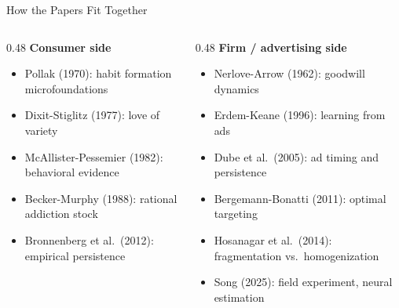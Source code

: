 \documentclass[aspectratio=169,professionalfonts]{beamer}
\newcommand{\hl}[1]{\textbf{\textcolor{UGARed}{#1}}}
\begin{document}
\begin{frame}{How the Papers Fit Together}
  \begin{columns}[T]
    \begin{column}{0.48\textwidth}
      \hl{Consumer side}
      \begin{itemize}\small
        \item Pollak (1970): habit formation microfoundations
        \item Dixit-Stiglitz (1977): love of variety
        \item McAllister-Pessemier (1982): behavioral evidence
        \item Becker-Murphy (1988): rational addiction stock
        \item Bronnenberg et al.\ (2012): empirical persistence
      \end{itemize}
    \end{column}
    \begin{column}{0.48\textwidth}
      \hl{Firm / advertising side}
      \begin{itemize}\small
        \item Nerlove-Arrow (1962): goodwill dynamics
        \item Erdem-Keane (1996): learning from ads
        \item Dube et al.\ (2005): ad timing and persistence
        \item Bergemann-Bonatti (2011): optimal targeting
        \item Hosanagar et al.\ (2014): fragmentation vs.\ homogenization
        \item Song (2025): field experiment, neural estimation
      \end{itemize}
    \end{column}
  \end{columns}
\end{frame}
\end{document}
